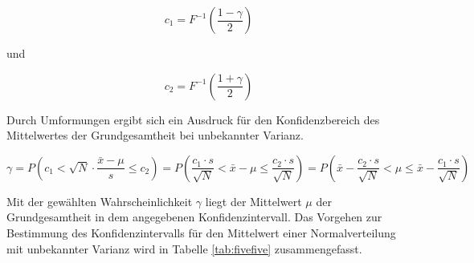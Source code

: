 \begin{equation}\label{eq:fivefiftyfour}
c_{1} =F^{-1} \left(\dfrac{1-\gamma }{2} \right)
\end{equation}

\noindent und

\begin{equation}\label{eq:fivefiftyfive}
c_{2} =F^{-1} \left(\dfrac{1+\gamma }{2} \right)
\end{equation}

\noindent Durch Umformungen ergibt sich ein Ausdruck f\"{u}r den Konfidenzbereich des Mittelwertes der Grundgesamtheit bei unbekannter Varianz.

\begin{equation}\label{eq:fivefiftysix}
\gamma =P\left(c_{1} <\sqrt{N} \cdot \dfrac{\bar{x}-\mu }{s} \le c_{2} \right)=P\left(\dfrac{c_{1} \cdot s}{\sqrt{N} } <\bar{x}-\mu \le \dfrac{c_{2} \cdot s}{\sqrt{N} } \right)=P\left(\bar{x}-\dfrac{c_{2} \cdot s}{\sqrt{N} } <\mu \le \bar{x}-\dfrac{c_{1} \cdot s}{\sqrt{N} } \right)
\end{equation}

\noindent Mit der gew\"{a}hlten Wahrscheinlichkeit $\gamma$ liegt der Mittelwert $\mu$ der Grundgesamtheit in dem angegebenen Konfidenzintervall. Das Vorgehen zur Bestimmung des Konfidenzintervalls f\"{u}r den Mittelwert einer Normalverteilung mit unbekannter Varianz wird in Tabelle \ref{tab:fivefive} zusammengefasst.


